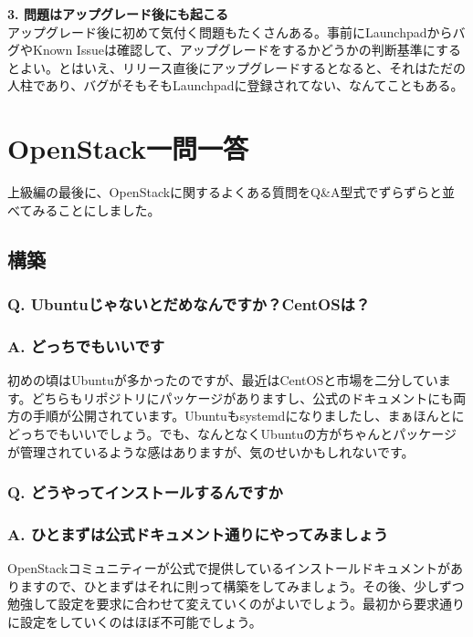 \documentclass[9pt,b5paper,tombo,openany]{jsbook}
\begin{document}
\noindent
\textbf{3. 問題はアップグレード後にも起こる}\\[1ex]

アップグレード後に初めて気付く問題もたくさんある。事前にLaunchpadからバグやKnown Issueは確認して、アップグレードをするかどうかの判断基準にするとよい。とはいえ、リリース直後にアップグレードするとなると、それはただの人柱であり、バグがそもそもLaunchpadに登録されてない、なんてこともある。

\chapter{OpenStack一問一答}

上級編の最後に、OpenStackに関するよくある質問をQ\&A型式でずらずらと並べてみることにしました。

\section{構築}

\subsection*{{\LARGE\bfseries Q.} Ubuntuじゃないとだめなんですか？CentOSは？}
\subsection*{{\LARGE\bfseries A.} どっちでもいいです}
初めの頃はUbuntuが多かったのですが、最近はCentOSと市場を二分しています。どちらもリポジトリにパッケージがありますし、公式のドキュメントにも両方の手順が公開されています。Ubuntuもsystemdになりましたし、まぁほんとにどっちでもいいでしょう。でも、なんとなくUbuntuの方がちゃんとパッケージが管理されているような感はありますが、気のせいかもしれないです。

\subsection*{{\LARGE\bfseries Q.} どうやってインストールするんですか}
\subsection*{{\LARGE\bfseries A.} ひとまずは公式ドキュメント通りにやってみましょう}
OpenStackコミュニティーが公式で提供しているインストールドキュメントがありますので、ひとまずはそれに則って構築をしてみましょう。その後、少しずつ勉強して設定を要求に合わせて変えていくのがよいでしょう。最初から要求通りに設定をしていくのはほぼ不可能でしょう。
\end{document}
